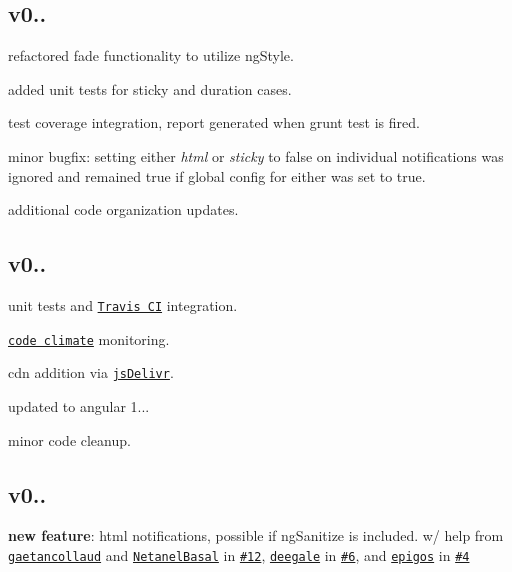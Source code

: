 \subsection*{v0..}


\begin{DoxyItemize}
\item refactored fade functionality to utilize ng\+Style.
\item added unit tests for sticky and duration cases.
\item test coverage integration, report generated when {\ttfamily grunt test} is fired.
\item minor bugfix\+: setting either {\itshape html} or {\itshape sticky} to false on individual notifications was ignored and remained true if global config for either was set to true.
\item additional code organization updates.
\end{DoxyItemize}

\subsection*{v0..}


\begin{DoxyItemize}
\item unit tests and \href{https://travis-ci.org/matowens/ng-notify}{\tt Travis CI} integration.
\item \href{https://codeclimate.com/github/matowens/ng-notify}{\tt code climate} monitoring.
\item cdn addition via \href{http://www.jsdelivr.com/#!angular.ng-notify}{\tt js\+Delivr}.
\item updated to angular 1...
\item minor code cleanup.
\end{DoxyItemize}

\subsection*{v0..}


\begin{DoxyItemize}
\item {\bfseries new feature}\+: html notifications, possible if ng\+Sanitize is included. w/ help from \href{https://github.com/gaetancollaud}{\tt gaetancollaud} and \href{https://github.com/NetanelBasal}{\tt Netanel\+Basal} in \href{https://github.com/matowens/ng-notify/issues/12}{\tt \#12}, \href{https://github.com/deegale}{\tt deegale} in \href{https://github.com/matowens/ng-notify/issues/6}{\tt \#6}, and \href{https://github.com/epigos}{\tt epigos} in \href{https://github.com/matowens/ng-notify/pull/4}{\tt \#4}
\end{DoxyItemize}

